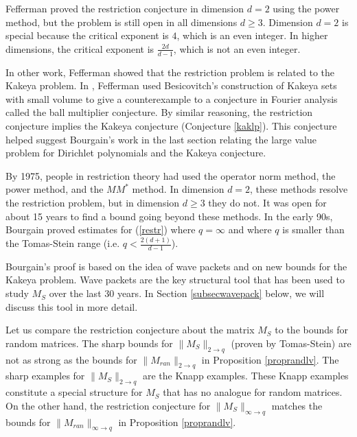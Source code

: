 \documentclass{amsart}
\begin{document}
Fefferman \cite{F3} proved the restriction conjecture in dimension $d=2$ using the power method, but the problem is still open in all dimensions $d \ge 3$.  Dimension $d=2$ is special because the critical exponent is $4$, which is an even integer.  In higher dimensions, the critical exponent is $\frac{2d}{d-1}$, which is not an even integer.

In other work, Fefferman showed that the restriction problem is related to the Kakeya problem.  In \cite{F1}, Fefferman used Besicovitch's construction of Kakeya sets with small volume to give a counterexample to a conjecture in Fourier analysis called the ball multiplier conjecture.  By similar reasoning, the restriction conjecture implies the Kakeya conjecture (Conjecture \ref{kaklp}).  This conjecture helped suggest Bourgain's work in the last section relating the large value problem for Dirichlet polynomials and the Kakeya conjecture.  

By 1975, people in restriction theory had used the operator norm method, the power method, and the $M M^*$ method.  In dimension $d=2$, these methods resolve the restriction problem, but in dimension $d \ge 3$ they do not.  It was open for about 15 years to find a bound going beyond these methods.  In the early 90s, Bourgain \cite{B3} proved estimates for (\ref{restr}) where $q = \infty$ and where $q$ is smaller than the Tomas-Stein range (i.e. $ q< \frac{2(d+1)}{d-1}$).  

Bourgain's proof is based on the idea of wave packets and on new bounds for the Kakeya problem.   Wave packets are the key structural tool that has been used to study $M_S$ over the last 30 years.   In Section \ref{subsecwavepack} below,  we will discuss this tool in more detail. 

Let us compare the restriction conjecture about the matrix $M_S$ to the bounds for random matrices.   The sharp bounds for $\| M_S \|_{2 \rightarrow q}$ (proven by Tomas-Stein) are not as strong as the bounds for $\| M_{ran} \|_{2 \rightarrow q}$  in Proposition \ref{proprandlv}.   The sharp examples for $\| M_S \|_{2 \rightarrow q}$ are the Knapp examples.   These Knapp examples constitute a special structure for $M_S$ that has no analogue for random matrices.   On the other hand,  the restriction conjecture for $\| M_S \|_{\infty \rightarrow q}$ matches the bounds for $\| M_{ran} \|_{\infty \rightarrow q}$ in Proposition \ref{proprandlv}. 
\end{document}
